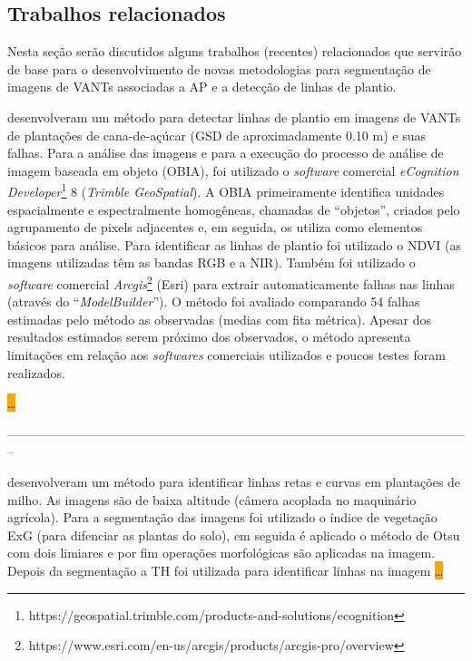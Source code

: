 \documentclass[12pt, a4paper, english, brazil]{article}
\newcommand{\dotsBlue}{\colorbox{orange}{\textcolor{blue}{\dots}}}
\newcommand{\linePage}{--------------------------------------------------------------------------------------------------------------}
\begin{document}


\subsection{Trabalhos relacionados}

Nesta seção serão discutidos alguns trabalhos (recentes) relacionados que servirão de base para o desenvolvimento de novas metodologias para segmentação de imagens de VANTs associadas a AP e a detecção de linhas de plantio.

 desenvolveram um método para detectar linhas de plantio em imagens de VANTs de plantações de cana-de-açúcar (GSD de aproximadamente 0.10 m) e suas falhas. Para a análise das imagens e para a execução do processo de análise de imagem baseada em objeto (OBIA), foi utilizado o \textit{software} comercial \textit{eCognition Developer}\footnote{https://geospatial.trimble.com/products-and-solutions/ecognition} 8 (\textit{Trimble GeoSpatial}). A OBIA primeiramente identifica unidades espacialmente e espectralmente homogêneas, chamadas de ``objetos'', criados pelo agrupamento de pixels adjacentes e, em seguida, os utiliza como elementos básicos para análise.
Para identificar as linhas de plantio foi utilizado o NDVI (as imagens utilizadas têm as bandas RGB e a NIR). Também foi utilizado o \textit{software} comercial \textit{Arcgis}\footnote{https://www.esri.com/en-us/arcgis/products/arcgis-pro/overview} (Esri) para extrair automaticamente falhas nas linhas (através do ``\textit{ModelBuilder}''). O método foi avaliado comparando 54 falhas estimadas pelo método as observadas (medias com fita métrica). Apesar dos resultados estimados serem próximo dos observados, o método apresenta limitações em relação aos \textit{softwares} comerciais utilizados e poucos testes foram realizados.



\dotsBlue

\linePage

 desenvolveram um método para identificar linhas retas e curvas em plantações de milho. As imagens são de baixa altitude (câmera acoplada no maquinário agrícola). Para a segmentação das imagens foi utilizado o índice de vegetação ExG (para difenciar as plantas do solo), em seguida é aplicado o método de Otsu com dois limiares e por fim operações morfológicas são aplicadas na imagem. Depois da segmentação a TH foi utilizada para identificar linhas na imagem \dotsBlue
\end{document}
